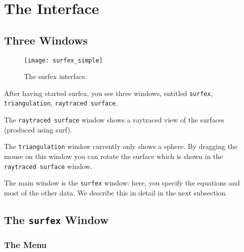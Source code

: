 \documentclass{article}
\newcommand{\surfex}{{\sc surfex}}
\begin{document}
%
\section{The Interface}


%
\subsection{Three Windows}

\begin{figure}[htbp]
  \begin{center}
    \texttt{[image: surfex\_simple]}
    \caption{The \surfex{} interface.}
    \label{fig:surfex_simple}
  \end{center}
\end{figure}

After having started \surfex, you see three windows, entitled {\tt surfex}, {\tt
  triangulation}, {\tt raytraced surface}.

The {\tt raytraced surface} window shows a raytraced view of the surfaces
(produced using {\sc surf}).

The {\tt triangulation} window currently only shows a sphere.
By dragging the mouse on this window you can rotate the surface which is
shown in the {\tt raytraced surface} window.

The main window is the {\tt surfex} window:
here, you specify the equations and most of the other data.
We describe this in detail in the next subsection.



%
\subsection{The {\tt surfex} Window}


%
\subsubsection{The Menu}
\end{document}
